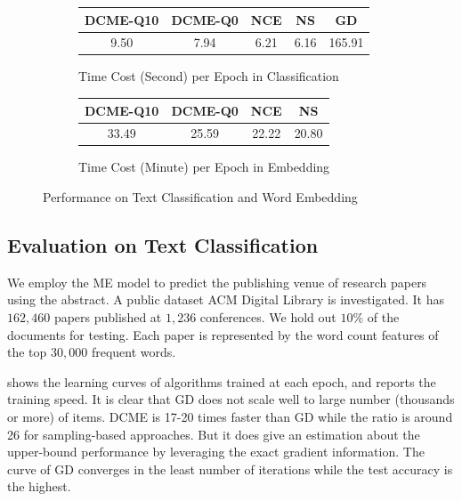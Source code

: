 \begin{figure}
\begin{subfigure}[h]{0.7\textwidth}
            \label{fig::word_embedding}
        \end{subfigure}
        \begin{subfigure}[h]{0.65\textwidth}
            \centering
            \begin{tabular}{c|c|c|c|c}
              DCME-Q10  & DCME-Q0   & NCE   & NS        & GD     \\ \hline\hline
              9.50      & 7.94      & 6.21  & 6.16      & 165.91 \\
            \end{tabular}
            \captionsetup{justification=centering}
            \caption{Time Cost (Second) per Epoch in Classification}
            \label{tab::classification_time}
        \end{subfigure}
        \begin{subfigure}[h]{0.65\textwidth}
            \centering
            \begin{tabular}{c|c|c|c}
              DCME-Q10  & DCME-Q0   & NCE     & NS       \\ \hline\hline
              33.49     & 25.59     & 22.22   & 20.80    \\
            \end{tabular}
            \captionsetup{justification=centering}
            \caption{Time Cost (Minute) per Epoch in Embedding}
            \label{tab::we_time}
        \end{subfigure}
        \caption{ Performance on Text Classification and Word Embedding }
\end{figure}

\subsection{Evaluation on Text Classification}

We employ the ME model to predict the publishing venue of research papers using
the abstract. A public dataset ACM Digital Library is investigated. It has
$162,460$ papers published at $1,236$ conferences. We hold out $10\%$ of the
documents for testing. Each paper is represented by the word count features of
the top $30,000$ frequent words.

 shows the learning curves of algorithms trained
at each epoch, and  reports the training
speed. It is clear that GD does not scale well to large number (thousands or
more) of items. DCME is 17-20 times faster than GD while the ratio is around 26
for sampling-based approaches. But it does give an estimation about the
upper-bound performance by leveraging the exact gradient information.  The curve
of GD converges in the least number of iterations while the test accuracy is the
highest.

